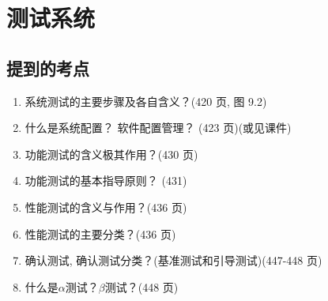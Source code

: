 \documentclass[14pt, letterpaper, UTF8, fontset=windowsnew, heading=true]{article}
\begin{document}
\section{测试系统}

\subsection{提到的考点}

\begin{enumerate}
	\item 系统测试的主要步骤及各自含义？(420 页, 图 9.2)
	\item 什么是系统配置？ 软件配置管理？
	(423 页)(或见课件) \\
	\item 功能测试的含义极其作用？(430 页)
	\item 功能测试的基本指导原则？ (431)
	\item 性能测试的含义与作用？(436 页)
	\item 性能测试的主要分类？(436 页)
	\item 确认测试, 确认测试分类？(基准测试和引导测试)(447-448 页)
	\item 什么是$\alpha$测试？$\beta$测试？(448 页)
\end{enumerate}
\end{document}
